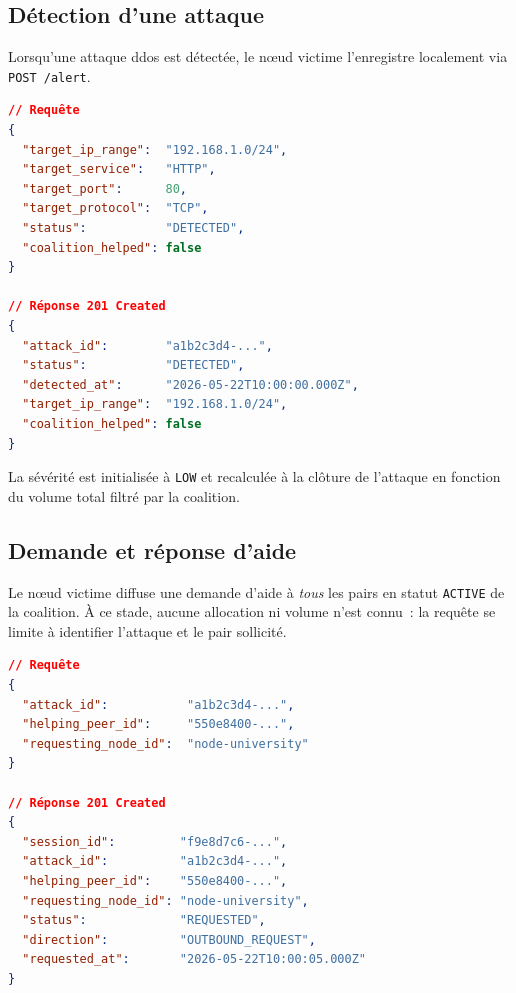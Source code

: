 \subsection{Détection d'une attaque}

Lorsqu'une attaque \gls{ddos} est détectée, le nœud victime l'enregistre localement via \texttt{POST /alert}.

\begin{lstlisting}[language=json, caption={Requête et réponse — \texttt{POST /alert}.}, label=lst:alert]
// Requête
{
  "target_ip_range":  "192.168.1.0/24",
  "target_service":   "HTTP",
  "target_port":      80,
  "target_protocol":  "TCP",
  "status":           "DETECTED",
  "coalition_helped": false
}

// Réponse 201 Created
{
  "attack_id":        "a1b2c3d4-...",
  "status":           "DETECTED",
  "detected_at":      "2026-05-22T10:00:00.000Z",
  "target_ip_range":  "192.168.1.0/24",
  "coalition_helped": false
}
\end{lstlisting}

La sévérité est initialisée à \texttt{LOW} et recalculée à la clôture de l'attaque en fonction du volume total filtré par la coalition.

\subsection{Demande et réponse d'aide}

Le nœud victime diffuse une demande d'aide à \emph{tous} les pairs en statut \texttt{ACTIVE} de la coalition. À ce stade, aucune allocation ni volume n'est connu~: la requête se limite à identifier l'attaque et le pair sollicité.

\begin{lstlisting}[language=json, caption={Requête et réponse — \texttt{POST /help/request} (sollicitation diffusée, sans allocation).}, label=lst:helpreq]
// Requête
{
  "attack_id":           "a1b2c3d4-...",
  "helping_peer_id":     "550e8400-...",
  "requesting_node_id":  "node-university"
}

// Réponse 201 Created
{
  "session_id":         "f9e8d7c6-...",
  "attack_id":          "a1b2c3d4-...",
  "helping_peer_id":    "550e8400-...",
  "requesting_node_id": "node-university",
  "status":             "REQUESTED",
  "direction":          "OUTBOUND_REQUEST",
  "requested_at":       "2026-05-22T10:00:05.000Z"
}
\end{lstlisting}

